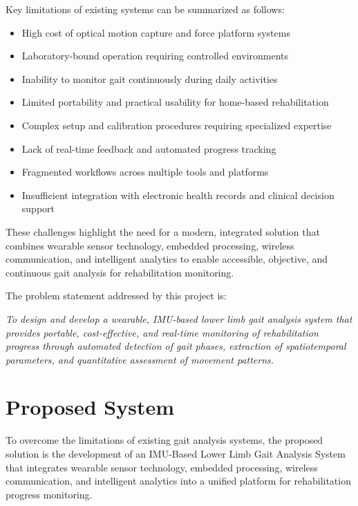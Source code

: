 \documentclass[12pt,a4paper]{report}
\begin{document}
Key limitations of existing systems can be summarized as follows:
\begin{itemize}
\item High cost of optical motion capture and force platform systems

\item Laboratory-bound operation requiring controlled environments

\item Inability to monitor gait continuously during daily activities

\item Limited portability and practical usability for home-based rehabilitation

\item Complex setup and calibration procedures requiring specialized expertise

\item Lack of real-time feedback and automated progress tracking

\item Fragmented workflows across multiple tools and platforms

\item Insufficient integration with electronic health records and clinical decision support
\end{itemize}
These challenges highlight the need for a modern, integrated solution that combines wearable sensor technology, embedded processing, wireless communication, and intelligent analytics to enable accessible, objective, and continuous gait analysis for rehabilitation monitoring.

The problem statement addressed by this project is:

\textit{To design and develop a wearable, IMU-based lower limb gait analysis system that provides portable, cost-effective, and real-time monitoring of rehabilitation progress through automated detection of gait phases, extraction of spatiotemporal parameters, and quantitative assessment of movement patterns.}

\section{Proposed System}
To overcome the limitations of existing gait analysis systems, the proposed solution is the development of an IMU-Based Lower Limb Gait Analysis System that integrates wearable sensor technology, embedded processing, wireless communication, and intelligent analytics into a unified platform for rehabilitation progress monitoring.
\end{document}
